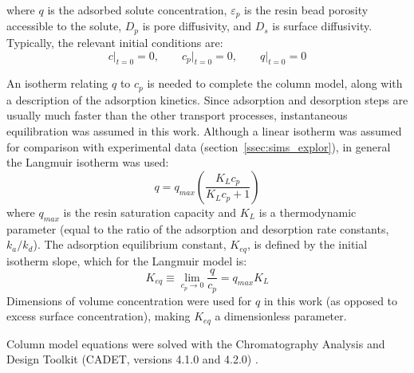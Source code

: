\documentclass[preprint,review,12pt]{elsarticle}
\begin{document}
        where $q$ is the adsorbed solute concentration, $\varepsilon_p$ is the resin bead porosity accessible to the solute, $D_p$ is pore diffusivity, and $D_s$ is surface diffusivity. Typically, the relevant initial conditions are:
        \begin{equation} \label{eq:ic}
            c\big|_{t=0} = 0, \qquad c_p\big|_{t=0} = 0, \qquad q\big|_{t=0} = 0
        \end{equation}

        An isotherm relating $q$ to $c_p$ is needed to complete the column model, along with a description of the adsorption kinetics. Since adsorption and desorption steps are usually much faster than the other transport processes, instantaneous equilibration was assumed in this work. Although a linear isotherm was assumed for comparison with experimental data (section~\ref{ssec:sims_explor}), in general the Langmuir isotherm was used:
        \begin{equation} \label{eq:langmuir_ss}
            q = q_{max} \left( \frac{K_L c_p}{K_L c_p + 1} \right)
        \end{equation}
        where $q_{max}$ is the resin saturation capacity and $K_L$ is a thermodynamic parameter (equal to the ratio of the adsorption and desorption rate constants, $k_a/k_d$). The adsorption equilibrium constant, $K_{eq}$, is defined by the initial isotherm slope, which for the Langmuir model is:
        \begin{equation} \label{eq:langmuir_keq}
            K_{eq} \equiv \lim_{c_p \to 0} \frac{q}{c_p} = q_{max} K_L
        \end{equation}
        Dimensions of volume concentration were used for $q$ in this work (as opposed to excess surface concentration), making $K_{eq}$ a dimensionless parameter.

        Column model equations were solved with the Chromatography Analysis and Design Toolkit (CADET, versions 4.1.0 and 4.2.0) \cite{Leweke2018}.
\end{document}
